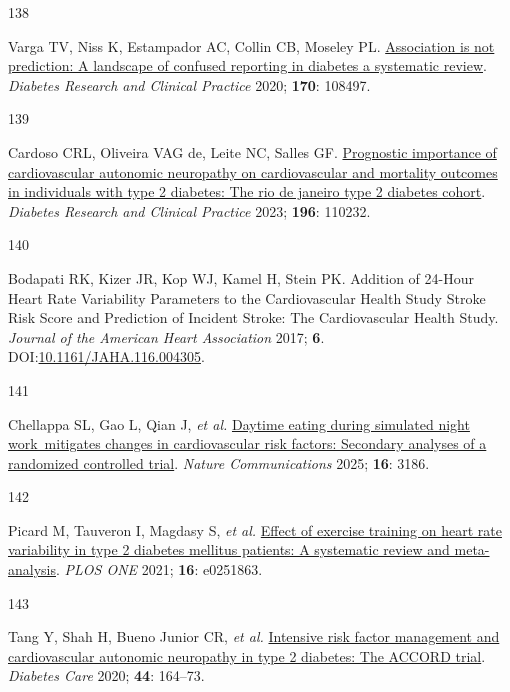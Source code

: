 \documentclass[
  letterpaper,
  headsepline=true,
  open=any]{scrbook}
\newlength{\cslhangindent}
\newlength{\csllabelwidth}
\newlength{\cslentryspacingunit} %
\newenvironment{CSLReferences}[2] %
 {%
  \setlength{\parindent}{0pt}
  \ifodd #1
  \let\oldpar\par
  \def\par{\hangindent=\cslhangindent\oldpar}
  \fi
  \setlength{\parskip}{#2\cslentryspacingunit}
 }%
 {}
\newcommand{\CSLLeftMargin}[1]{\parbox[t]{\csllabelwidth}{#1}}
\newcommand{\CSLRightInline}[1]{\parbox[t]{\linewidth - \csllabelwidth}{#1}\break}
\begin{document}
\begin{CSLReferences}{0}{0}
\leavevmode{}%
\CSLLeftMargin{138 }%
\CSLRightInline{Varga TV, Niss K, Estampador AC, Collin CB, Moseley PL.
\href{https://doi.org/10.1016/j.diabres.2020.108497}{Association is not
prediction: A landscape of confused reporting in diabetes {\textendash}
a systematic review}. \emph{Diabetes Research and Clinical Practice}
2020; \textbf{170}: 108497.}

\leavevmode{}%
\CSLLeftMargin{139 }%
\CSLRightInline{Cardoso CRL, Oliveira VAG de, Leite NC, Salles GF.
\href{https://doi.org/10.1016/j.diabres.2022.110232}{Prognostic
importance of cardiovascular autonomic neuropathy on cardiovascular and
mortality outcomes in individuals with type 2 diabetes: The rio de
janeiro type 2 diabetes cohort}. \emph{Diabetes Research and Clinical
Practice} 2023; \textbf{196}: 110232.}

\leavevmode{}%
\CSLLeftMargin{140 }%
\CSLRightInline{Bodapati RK, Kizer JR, Kop WJ, Kamel H, Stein PK.
Addition of 24-Hour Heart Rate Variability Parameters to the
Cardiovascular Health Study Stroke Risk Score and Prediction of Incident
Stroke: The Cardiovascular Health Study. \emph{Journal of the American
Heart Association} 2017; \textbf{6}.
DOI:\href{https://doi.org/10.1161/JAHA.116.004305}{10.1161/JAHA.116.004305}.}

\leavevmode{}%
\CSLLeftMargin{141 }%
\CSLRightInline{Chellappa SL, Gao L, Qian J, \emph{et al.}
\href{https://doi.org/10.1038/s41467-025-57846-y}{Daytime eating during
simulated night work~mitigates changes in cardiovascular risk factors:
Secondary analyses of a randomized controlled trial}. \emph{Nature
Communications} 2025; \textbf{16}: 3186.}

\leavevmode{}%
\CSLLeftMargin{142 }%
\CSLRightInline{Picard M, Tauveron I, Magdasy S, \emph{et al.}
\href{https://doi.org/10.1371/journal.pone.0251863}{Effect of exercise
training on heart rate variability in type 2 diabetes mellitus patients:
A systematic review and meta-analysis}. \emph{PLOS ONE} 2021;
\textbf{16}: e0251863.}

\leavevmode{}%
\CSLLeftMargin{143 }%
\CSLRightInline{Tang Y, Shah H, Bueno Junior CR, \emph{et al.}
\href{https://doi.org/10.2337/dc20-1842}{Intensive risk factor
management and cardiovascular autonomic neuropathy in type 2 diabetes:
The ACCORD trial}. \emph{Diabetes Care} 2020; \textbf{44}: 164--73.}


\end{CSLReferences}
\end{document}
